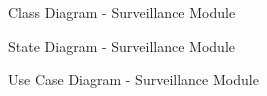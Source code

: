 \documentclass[english]{article}
\begin{document}
        \begin{figure}[H]
            \centering	            
            \centerline{}
            \caption{Class Diagram - Surveillance Module}
        \end{figure}
        
        \begin{figure}[H]
            \centering	            
            \centerline{}
            \caption{State Diagram - Surveillance Module}
        \end{figure}
        
        \begin{figure}[H]
            \centering	            
            \centerline{}
            \caption{Use Case Diagram - Surveillance Module}
        \end{figure}    
\end{document}
